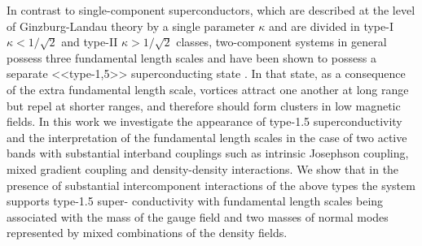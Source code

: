\documentclass[notitlepage,12pt,a4paper]{report}
\begin{document}
  
  \begin{center}
    In contrast to single-component superconductors, which are described at the
    level of Ginzburg-Landau theory by a single parameter \( \kappa \) and are
    divided in type-I \( \kappa < 1/\sqrt{2} \) and type-II
    \( \kappa > 1/\sqrt{2} \) classes, two-component systems in general possess
    three fundamental length scales and have been shown to possess a separate
    <<type-1,5>> superconducting state\cite{bib:1,bib:2}
. In that state, as a consequence of
the extra fundamental length scale, vortices attract one another at long range but repel at shorter
ranges, and therefore should form clusters in low magnetic fields. In this work we investigate the
appearance of type-1.5 superconductivity and the interpretation of the fundamental length scales
in the case of two active bands with substantial interband couplings such as intrinsic Josephson
coupling, mixed gradient coupling and density-density interactions. We show that in the presence
of substantial intercomponent interactions of the above types the system supports type-1.5 super-
conductivity with fundamental length scales being associated with the mass of the gauge field and
two masses of normal modes represented by mixed combinations of the density fields.
  \end{center}
  
   \newpage
   \newpage
   \newpage
   \newpage
   \newpage
  \begin{appendix}
     \newpage
     \newpage
     \newpage
  \end{appendix}
  
\end{document}
